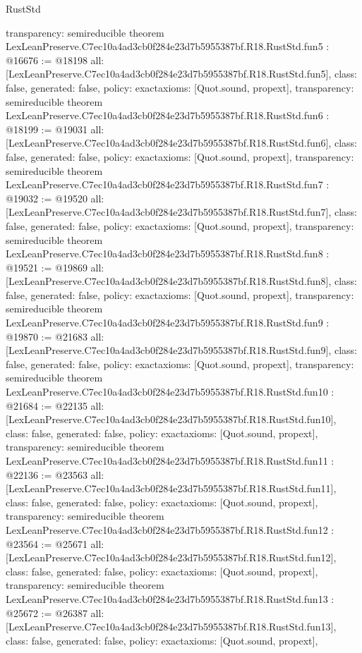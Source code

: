 \begin{lexlean}{RustStd}
\begin{coremodule}
{  transparency: semireducible
}
theorem LexLeanPreserve.C7ec10a4ad3cb0f284e23d7b5955387bf.R18.RustStd.fun5 : @16676 := @18198 {
  all: [LexLeanPreserve.C7ec10a4ad3cb0f284e23d7b5955387bf.R18.RustStd.fun5],
  class: false,
  generated: false,
  policy: exact{axioms: [Quot.sound, propext]},
  transparency: semireducible
}
theorem LexLeanPreserve.C7ec10a4ad3cb0f284e23d7b5955387bf.R18.RustStd.fun6 : @18199 := @19031 {
  all: [LexLeanPreserve.C7ec10a4ad3cb0f284e23d7b5955387bf.R18.RustStd.fun6],
  class: false,
  generated: false,
  policy: exact{axioms: [Quot.sound, propext]},
  transparency: semireducible
}
theorem LexLeanPreserve.C7ec10a4ad3cb0f284e23d7b5955387bf.R18.RustStd.fun7 : @19032 := @19520 {
  all: [LexLeanPreserve.C7ec10a4ad3cb0f284e23d7b5955387bf.R18.RustStd.fun7],
  class: false,
  generated: false,
  policy: exact{axioms: [Quot.sound, propext]},
  transparency: semireducible
}
theorem LexLeanPreserve.C7ec10a4ad3cb0f284e23d7b5955387bf.R18.RustStd.fun8 : @19521 := @19869 {
  all: [LexLeanPreserve.C7ec10a4ad3cb0f284e23d7b5955387bf.R18.RustStd.fun8],
  class: false,
  generated: false,
  policy: exact{axioms: [Quot.sound, propext]},
  transparency: semireducible
}
theorem LexLeanPreserve.C7ec10a4ad3cb0f284e23d7b5955387bf.R18.RustStd.fun9 : @19870 := @21683 {
  all: [LexLeanPreserve.C7ec10a4ad3cb0f284e23d7b5955387bf.R18.RustStd.fun9],
  class: false,
  generated: false,
  policy: exact{axioms: [Quot.sound, propext]},
  transparency: semireducible
}
theorem LexLeanPreserve.C7ec10a4ad3cb0f284e23d7b5955387bf.R18.RustStd.fun10 : @21684 := @22135 {
  all: [LexLeanPreserve.C7ec10a4ad3cb0f284e23d7b5955387bf.R18.RustStd.fun10],
  class: false,
  generated: false,
  policy: exact{axioms: [Quot.sound, propext]},
  transparency: semireducible
}
theorem LexLeanPreserve.C7ec10a4ad3cb0f284e23d7b5955387bf.R18.RustStd.fun11 : @22136 := @23563 {
  all: [LexLeanPreserve.C7ec10a4ad3cb0f284e23d7b5955387bf.R18.RustStd.fun11],
  class: false,
  generated: false,
  policy: exact{axioms: [Quot.sound, propext]},
  transparency: semireducible
}
theorem LexLeanPreserve.C7ec10a4ad3cb0f284e23d7b5955387bf.R18.RustStd.fun12 : @23564 := @25671 {
  all: [LexLeanPreserve.C7ec10a4ad3cb0f284e23d7b5955387bf.R18.RustStd.fun12],
  class: false,
  generated: false,
  policy: exact{axioms: [Quot.sound, propext]},
  transparency: semireducible
}
theorem LexLeanPreserve.C7ec10a4ad3cb0f284e23d7b5955387bf.R18.RustStd.fun13 : @25672 := @26387 {
  all: [LexLeanPreserve.C7ec10a4ad3cb0f284e23d7b5955387bf.R18.RustStd.fun13],
  class: false,
  generated: false,
  policy: exact{axioms: [Quot.sound, propext]},
}
\end{coremodule}
\end{lexlean}
